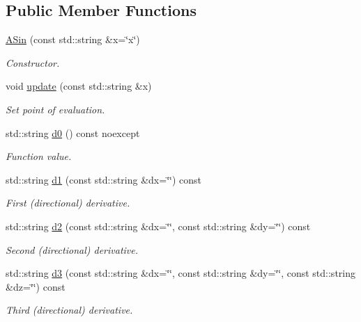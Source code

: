 \subsection*{Public Member Functions}
\begin{DoxyCompactItemize}
\item 
\hyperlink{structFunG_1_1stringify_1_1ASin_a45f7b447d7830fc5ca2471b8ecad3aea}{A\-Sin} (const std\-::string \&x=\char`\"{}x\char`\"{})
\begin{DoxyCompactList}\small\item\em Constructor. \end{DoxyCompactList}\item 
void \hyperlink{structFunG_1_1stringify_1_1ASin_ad3d41fb5fc4f4627dd46b50203e50293}{update} (const std\-::string \&x)
\begin{DoxyCompactList}\small\item\em Set point of evaluation. \end{DoxyCompactList}\item 
std\-::string \hyperlink{structFunG_1_1stringify_1_1ASin_af0ede3a3b0de798bca4890d43232b760}{d0} () const noexcept
\begin{DoxyCompactList}\small\item\em Function value. \end{DoxyCompactList}\item 
std\-::string \hyperlink{structFunG_1_1stringify_1_1ASin_a19425e85304dc6c4b4bcbb50e82f5bfe}{d1} (const std\-::string \&dx=\char`\"{}\char`\"{}) const 
\begin{DoxyCompactList}\small\item\em First (directional) derivative. \end{DoxyCompactList}\item 
std\-::string \hyperlink{structFunG_1_1stringify_1_1ASin_a6d2de4322435dbe7feaaad63c2468f72}{d2} (const std\-::string \&dx=\char`\"{}\char`\"{}, const std\-::string \&dy=\char`\"{}\char`\"{}) const 
\begin{DoxyCompactList}\small\item\em Second (directional) derivative. \end{DoxyCompactList}\item 
std\-::string \hyperlink{structFunG_1_1stringify_1_1ASin_ae73b155636f481bab7b2dea7153fc923}{d3} (const std\-::string \&dx=\char`\"{}\char`\"{}, const std\-::string \&dy=\char`\"{}\char`\"{}, const std\-::string \&dz=\char`\"{}\char`\"{}) const 
\begin{DoxyCompactList}\small\item\em Third (directional) derivative. \end{DoxyCompactList}\end{DoxyCompactItemize}



